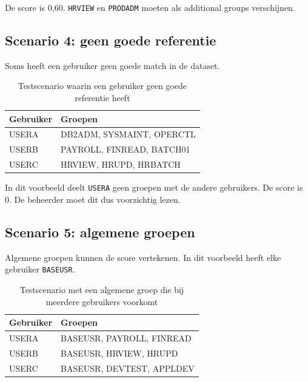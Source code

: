 De score is 0,60. \texttt{HRVIEW} en \texttt{PRODADM} moeten als additional groups verschijnen.

\subsection*{Scenario 4: geen goede referentie}

Soms heeft een gebruiker geen goede match in de dataset.

\begin{table}[htbp]
\centering
\caption[Scenario 4: geen goede referentie]{Testscenario waarin een gebruiker geen goede referentie heeft}
\label{tab:scenario-geen-goede-referentie}
\begin{tabular}{|p{3cm}|p{8cm}|}
\hline
\textbf{Gebruiker} & \textbf{Groepen} \\
\hline
USERA & DB2ADM, SYSMAINT, OPERCTL \\
\hline
USERB & PAYROLL, FINREAD, BATCH01 \\
\hline
USERC & HRVIEW, HRUPD, HRBATCH \\
\hline
\end{tabular}
\end{table}

In dit voorbeeld deelt \texttt{USERA} geen groepen met de andere gebruikers. De score is 0. De beheerder moet dit dus voorzichtig lezen.

\subsection*{Scenario 5: algemene groepen}

Algemene groepen kunnen de score vertekenen. In dit voorbeeld heeft elke gebruiker \texttt{BASEUSR}.

\begin{table}[htbp]
\centering
\caption[Scenario 5: algemene groepen]{Testscenario met een algemene groep die bij meerdere gebruikers voorkomt}
\label{tab:scenario-algemene-groepen}
\begin{tabular}{|p{3cm}|p{8cm}|}
\hline
\textbf{Gebruiker} & \textbf{Groepen} \\
\hline
USERA & BASEUSR, PAYROLL, FINREAD \\
\hline
USERB & BASEUSR, HRVIEW, HRUPD \\
\hline
USERC & BASEUSR, DEVTEST, APPLDEV \\
\hline
\end{tabular}
\end{table}

